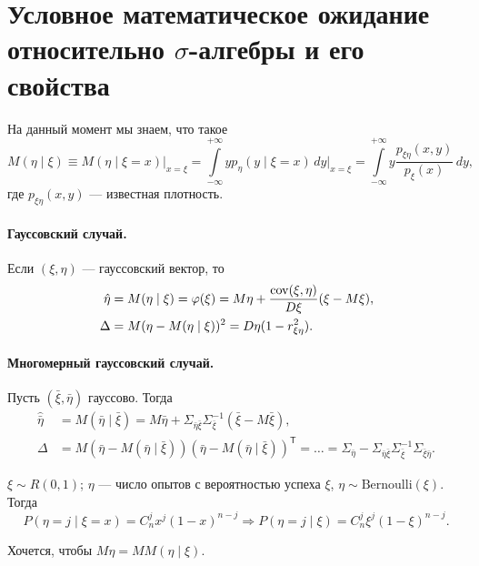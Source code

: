 \section{Условное математическое ожидание относительно $\sigma$-алгебры и его свойства}
На данный момент мы знаем, что такое
\[
  M(\eta \mid \xi) \equiv M(\eta \mid \xi = x) \Big|_{x = \xi}
  = \int\limits_{-\infty}^{+\infty} y p_{\eta} (y \mid \xi = x) \, dy \bigg|_{x = \xi}
  = \int\limits_{-\infty}^{+\infty} y \dfrac{p_{\xi\eta} (x, y)}{p_\xi (x)} \, dy,
\]
где $p_{\xi\eta} (x, y)$ --- известная плотность.

\paragraph{Гауссовский случай.}
Если $(\xi, \eta)$ --- гауссовский вектор, то
\begin{align*}
  \hat{\eta} &= M(\eta \mid \xi) = \varphi(\xi) = M\eta + \dfrac{\operatorname{cov}(\xi,
  \eta)}{D\xi} (\xi-M\xi), \\
    \Delta &= M(\eta - M(\eta\mid\xi))^2 = D\eta (1 - r_{\xi\eta}^2).
\end{align*}

\paragraph{Многомерный гауссовский случай.}
Пусть $(\bar{\xi}, \bar{\eta})$ гауссово. Тогда
\begin{align*}
  \hat{\bar{\eta}} &= M(\bar{\eta} \mid \bar{\xi}) = M\bar{\eta} +
  \Sigma_{\bar{\eta} \bar{\xi}} \Sigma_{\bar{\xi}}^{-1} (\bar{\xi} -
  M\bar{\xi}), \\
  \Delta &= M(\bar{\eta} - M(\bar{\eta} \mid \bar{\xi}))(\bar{\eta} -
  M(\bar{\eta} \mid \bar{\xi}))^{\mathsf T}
  = \ldots = \Sigma_{\bar{\eta}} - \Sigma_{\bar{\eta}\bar{\xi}} \Sigma_{\bar{\xi}}^{-1} \Sigma_{\bar{\xi} \bar{\eta}}.
\end{align*}

\begin{ex}\label{ex-bernoulli-with-random-parameter}
  $\xi \sim R(0, 1)$; $\eta$ --- число опытов с вероятностью успеха $\xi$, $\eta
  \sim \text{Bernoulli}(\xi)$.
  Тогда 
  \[
    P(\eta = j \mid \xi = x) = C_n^j x^j (1-x)^{n-j}
    \Rightarrow
    P(\eta = j \mid \xi) = C_n^j \xi^j (1-\xi)^{n-j}.
  \]

  Хочется, чтобы $M\eta = MM(\eta \mid \xi)$.
\end{ex}

